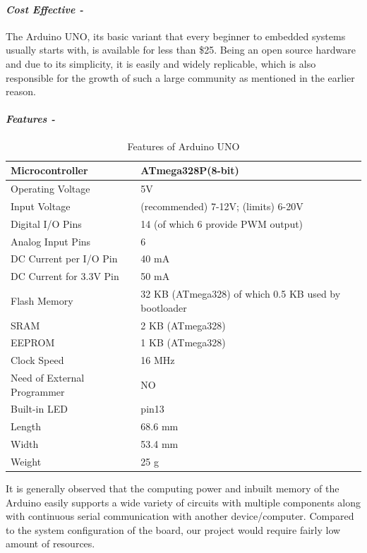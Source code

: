  \paragraph{\textit{Cost Effective -}}
 The Arduino UNO, its basic variant that every beginner to embedded systems usually starts with, is available for less than \$25. Being an open source hardware and due to its simplicity, it is easily and widely replicable, which is also responsible for the growth of such a large community as mentioned in the earlier reason.
 \paragraph{\textit{Features -}} 
 \begin{table}
 \centering
 \begin{tabular}{|l|l|}
 	\hline
 	Microcontroller &ATmega328P(8-bit)\\
 	\hline
 	Operating Voltage &5V\\
 	\hline
 	Input Voltage  &(recommended) 7-12V; (limits) 6-20V\\
 	\hline
 	Digital I/O Pins &14 (of which 6 provide PWM output)\\
 	\hline
 	Analog Input Pins &6\\
 	\hline
 	DC Current per I/O Pin &40 mA\\
 	\hline
 	DC Current for 3.3V Pin &50 mA\\
 	\hline
 	Flash Memory &32 KB (ATmega328) of which 0.5 KB used by bootloader\\
 	\hline
 	SRAM &2 KB (ATmega328)\\
 	\hline
 	EEPROM &1 KB (ATmega328)\\
 	\hline
 	Clock Speed &16 MHz\\
 	\hline
 	Need of External Programmer &NO\\
 	\hline
 	Built-in LED &pin13\\
 	\hline
 	Length &68.6 mm\\
 	\hline
 	Width &53.4 mm\\
 	\hline
 	Weight &25 g\\
 	\hline
  \end{tabular}
  \caption{Features of Arduino UNO}
  \label{tab:FeaturesArduino}
\end{table}
 It is generally observed that the computing power and inbuilt memory of the Arduino easily supports a wide variety of circuits with multiple components along with continuous serial communication with another device/computer. Compared to the system configuration of the board, our project would require fairly low amount of resources. \vspace{0.1cm} \linebreak 
